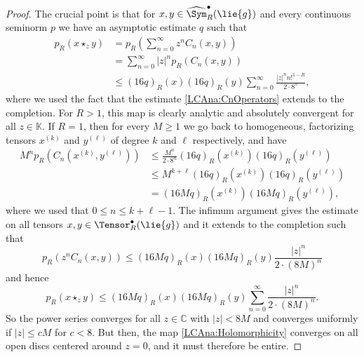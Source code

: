 \begin{proof}
	The crucial point is that for $x, y \in \widehat{\Sym}_R^\bullet
	(\lie{g})$ and every continuous seminorm $p$ we have an asymptotic
	estimate $q$ such that
	\begin{align*}
		p_R \left( x \star_z y \right)
		& =
		p_R
		\left(
			\sum\limits_{n=0}^{\infty}
			z^n C_n(x,y)
		\right)
		\\
		& =
		\sum\limits_{n=0}^{\infty}
		|z|^n
		p_R( C_n(x, y) )
		\\
		& \leq
		(16 q)_R (x)
        (16 q)_R (y)
		\sum\limits_{n=0}^{\infty}
        \frac{|z|^n n!^{1 - R}}{2 \cdot 8^n},
	\end{align*}
	where we used the fact that the estimate \eqref{LCAna:CnOperators}
	extends to the completion. For $R > 1$, this map is clearly analytic
	and absolutely convergent for all $z \in \mathbb{K}$.
	If $R = 1$, then for every $M \geq 1$ we go back to homogeneous,
	factorizing tensors $x^{(k)}$ and $y^{(\ell)}$ of degree $k$ and $\ell$
	respectively, and have
	\begin{align*}
		M^{n} p_R \left(
			C_n \left( x^{(k)}, y^{(\ell)} \right)
		\right)
		& \leq
		\frac{M^n}{2 \cdot 8^n}
		(16 q)_R \left( x^{(k)} \right)
		(16 q)_R \left( y^{(\ell)} \right)
		\\
		& \leq
		M^{k + \ell}
		(16 q)_R \left( x^{(k)} \right)
		(16 q)_R \left( y^{(\ell)} \right)
		\\
		& =
		(16M q)_R \left( x^{(k)} \right)
		(16M q)_R \left( y^{(\ell)} \right),
	\end{align*}
	where we used that $0 \leq n \leq k + \ell - 1$. The infimum argument 
	gives the estimate on all tensors $x,y \in \Tensor_R^{\bullet}(\lie{g})$ 
	and it extends to the completion such that
	\begin{equation*}
		p_R \left( z^n C_n(x, y) \right)
		\leq
		(16M q)_R(x) (16M q)_R(y)
		\frac{|z|^n}{2 \cdot (8M)^n}
	\end{equation*}
	and hence
	\begin{equation*}
		p_R(x \star_z y)
		\leq
		(16 M q)_R (x)
        (16 M q)_R (y)
		\sum\limits_{n=0}^{\infty}
        \frac{|z|^n}{2 \cdot (8M)^n}.
	\end{equation*}
	So the power series converges for all $z \in \mathbb{C}$ with
	$|z| < 8M$ and converges uniformly if $|z| \leq c M$ for $c < 8$.
	But then, the map \eqref{LCAna:Holomorphicity} converges on all open discs
	centered around $z = 0$, and it must therefore be entire.
\end{proof}

